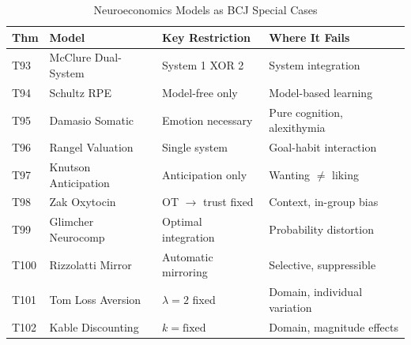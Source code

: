 \begin{table}[htbp]
\centering
\caption{Neuroeconomics Models as BCJ Special Cases}
\label{tab:neuro-boundaries}
\renewcommand{\arraystretch}{1.2}
\begin{tabular}{@{}llp{3.5cm}p{4cm}@{}}
\toprule
\textbf{Thm} & \textbf{Model} & \textbf{Key Restriction} & \textbf{Where It Fails} \\
\midrule
T93 & McClure Dual-System & System 1 XOR 2 & System integration \\
T94 & Schultz RPE & Model-free only & Model-based learning \\
T95 & Damasio Somatic & Emotion necessary & Pure cognition, alexithymia \\
T96 & Rangel Valuation & Single system & Goal-habit interaction \\
T97 & Knutson Anticipation & Anticipation only & Wanting $\neq$ liking \\
T98 & Zak Oxytocin & OT $\to$ trust fixed & Context, in-group bias \\
T99 & Glimcher Neurocomp & Optimal integration & Probability distortion \\
T100 & Rizzolatti Mirror & Automatic mirroring & Selective, suppressible \\
T101 & Tom Loss Aversion & $\lambda = 2$ fixed & Domain, individual variation \\
T102 & Kable Discounting & $k = \text{fixed}$ & Domain, magnitude effects \\
\bottomrule
\end{tabular}
\end{table}

